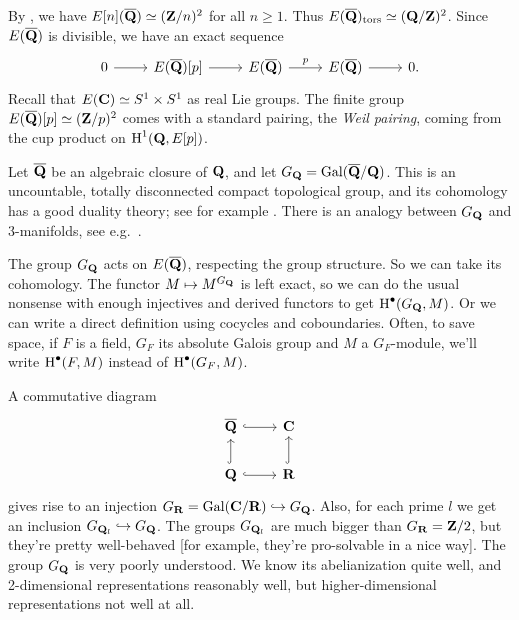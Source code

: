 By \cite[Cor 5.11]{moonenABV}, we have $E[n](\overline{\mathbf{Q}})\simeq (\mathbf{Z}/n)^2$ for 
all $n\geqslant 1$. Thus $E(\overline{\mathbf{Q}})_\mathrm{tors}\simeq (\mathbf{Q}/\mathbf{Z})^2$. 
Since $E(\overline{\mathbf{Q}})$ is divisible, we have an exact sequence 
\begin{equation}\label{eq:ell-ses}
\begin{tikzcd}
  0 \ar[r] 
    & E(\overline\dQ)[p] \ar[r] 
    & E(\overline\dQ) \ar[r, "p"] 
    & E(\overline\dQ) \ar[r] 
    & 0 .
\end{tikzcd}
\end{equation}
Recall that $E(\mathbf{C})\simeq S^1\times S^1$ as real Lie groups. The finite group 
$E(\overline{\mathbf{Q}})[p]\simeq (\mathbf{Z}/p)^2$ comes with a standard pairing, the 
\emph{Weil pairing}, coming from the cup product on $\operatorname{H}^1(\mathbf{Q},E[p])$. 

Let $\overline{\mathbf{Q}}$ be an algebraic closure of $\mathbf{Q}$, and let 
$G_{\mathbf{Q}}=\operatorname{Gal}(\overline{\mathbf{Q}}/\mathbf{Q})$. This is an uncountable, totally disconnected 
compact topological group, and its cohomology has a good duality theory; see for 
example \cite{neukirch-schmidt-winberg-2008}. There is an analogy between 
$G_{\mathbf{Q}}$ and 3-manifolds, see e.g.~\cite{morishita-2012}. 

The group $G_{\mathbf{Q}}$ acts on $E(\overline{\mathbf{Q}})$, respecting the group structure. So 
we can take its cohomology. 
The functor $M\mapsto M^{G_{\mathbf{Q}}}$ is left exact, so we can do the usual nonsense 
with enough injectives and derived functors to get $\operatorname{H}^\bullet(G_{\mathbf{Q}},M)$. Or we 
can write a direct definition using cocycles and coboundaries. Often, to save 
space, if $F$ is a field, $G_F$ its absolute Galois group and $M$ a 
$G_F$-module, we'll write $\operatorname{H}^\bullet(F,M)$ instead of $\operatorname{H}^\bullet(G_F,M)$. 

A commutative diagram 
\[\begin{tikzcd}
  \overline\dQ \ar[r, hook] 
    & \dC \\
  \dQ \ar[r, hook] \ar[u, hook] 
    & \dR \ar[u, hook] 
\end{tikzcd}\]
gives rise to an injection $G_{\mathbf{R}}=\operatorname{Gal}(\mathbf{C}/\mathbf{R})\hookrightarrow G_{\mathbf{Q}}$. Also, for 
each prime $l$ we get an inclusion $G_{\mathbf{Q}_l}\hookrightarrow G_{\mathbf{Q}}$. The groups 
$G_{\mathbf{Q}_l}$ are much bigger than $G_{\mathbf{R}}=\mathbf{Z}/2$, but they're pretty well-behaved 
[for example, they're pro-solvable in a nice way]. The group 
$G_{\mathbf{Q}}$ is very poorly understood. We know its abelianization quite well, and 
2-dimensional representations reasonably well, but higher-dimensional 
representations not well at all. 

